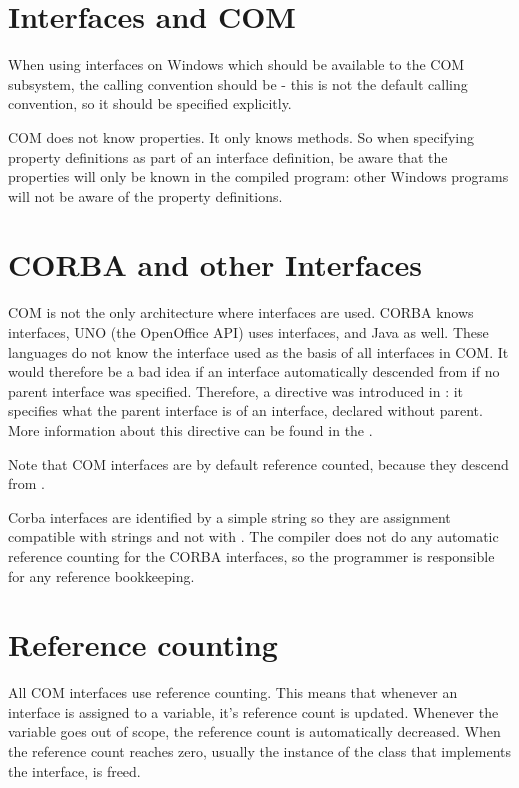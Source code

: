 \section{Interfaces and COM}
When using interfaces on Windows which should be available to the COM
subsystem, the calling convention should be  - this is not the
default \fpc calling convention, so it should be specified explicitly.

COM does not know properties. It only knows methods. So when specifying
property definitions as part of an interface definition, be aware that the
properties will only be known in the \fpc compiled program: other Windows
programs will not be aware of the property definitions. 

\section{CORBA and other Interfaces}
COM is not the only architecture where interfaces are used. CORBA knows
interfaces, UNO (the OpenOffice API) uses interfaces, and Java as well.
These languages do not know the  interface used as the basis of
all interfaces in COM. It would therefore be a bad idea if an interface
automatically descended from  if no parent interface was
specified. Therefore, a directive  was introduced in
 \fpc: it specifies what the parent interface is of an interface, declared
without parent. More information about this directive can be found in the
\progref.

Note that COM interfaces are by default reference counted, because they 
descend from .

Corba interfaces are identified by a simple string so they are assignment 
compatible with strings and not with . The compiler does not do 
any automatic reference counting for the CORBA interfaces, so the programmer 
is responsible for any reference bookkeeping.

\section{Reference counting}
All COM interfaces use reference counting.  This means that whenever an
interface is assigned to a variable, it's reference count is updated.
Whenever the variable goes out of scope, the reference count is
automatically decreased. When the reference count reaches zero, usually the
instance of the class that implements the interface, is freed.

